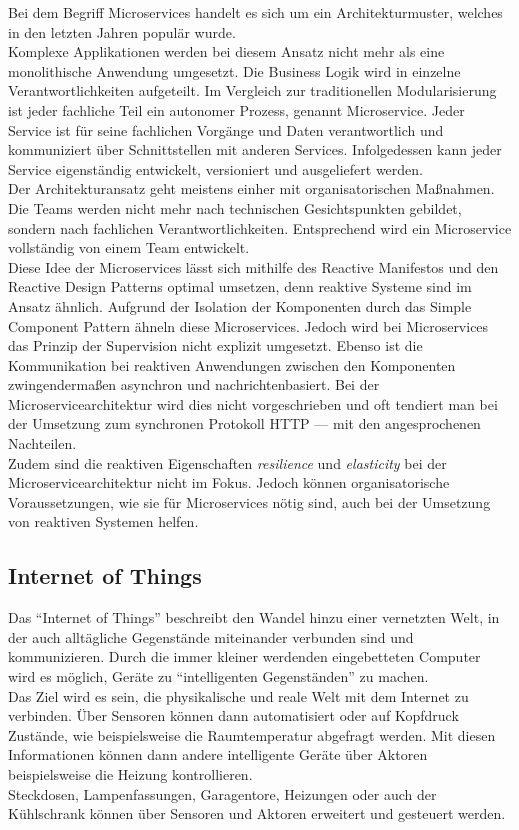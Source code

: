 Bei dem Begriff Microservices handelt es sich um ein Architekturmuster, welches in den letzten Jahren populär wurde.\\
Komplexe Applikationen werden bei diesem Ansatz nicht mehr als eine monolithische Anwendung umgesetzt. Die Business Logik wird in einzelne Verantwortlichkeiten aufgeteilt. Im Vergleich zur traditionellen Modularisierung ist jeder fachliche Teil ein autonomer Prozess, genannt Microservice. Jeder Service ist für seine fachlichen Vorgänge und Daten verantwortlich und kommuniziert über Schnittstellen mit anderen Services. Infolgedessen kann jeder Service eigenständig entwickelt, versioniert und ausgeliefert werden.\\
Der Architekturansatz geht meistens einher mit organisatorischen Maßnahmen. Die Teams werden nicht mehr nach technischen Gesichtspunkten gebildet, sondern nach fachlichen Verantwortlichkeiten. Entsprechend wird ein Microservice vollständig von einem Team entwickelt.\\

Diese Idee der Microservices lässt sich mithilfe des Reactive Manifestos und den Reactive Design Patterns optimal umsetzen, denn reaktive Systeme sind im Ansatz ähnlich. Aufgrund der Isolation der Komponenten durch das Simple Component Pattern ähneln diese Microservices. Jedoch wird bei Microservices das Prinzip der Supervision nicht explizit umgesetzt. Ebenso ist die Kommunikation bei reaktiven Anwendungen zwischen den Komponenten zwingendermaßen asynchron und nachrichtenbasiert. Bei der Microservicearchitektur wird dies nicht vorgeschrieben und oft tendiert man bei der Umsetzung zum synchronen Protokoll HTTP --- mit den angesprochenen Nachteilen.\\
Zudem sind die reaktiven Eigenschaften \textit{resilience} und \textit{elasticity} bei der Microservicearchitektur nicht im Fokus. Jedoch können organisatorische Voraussetzungen, wie sie für Microservices nötig sind, auch bei der Umsetzung von reaktiven Systemen helfen.

\subsection{Internet of Things}
Das \enquote{Internet of Things} beschreibt den Wandel hinzu einer vernetzten Welt, in der auch alltägliche Gegenstände miteinander verbunden sind und kommunizieren. Durch die immer kleiner werdenden eingebetteten Computer wird es möglich, Geräte zu \enquote{intelligenten Gegenständen} zu machen.\\
Das Ziel wird es sein, die physikalische und reale Welt mit dem Internet zu verbinden. Über Sensoren können dann automatisiert oder auf Kopfdruck Zustände, wie beispielsweise die Raumtemperatur abgefragt werden. Mit diesen Informationen können dann andere intelligente Geräte über Aktoren beispielsweise die Heizung kontrollieren.\\
Steckdosen, Lampenfassungen, Garagentore, Heizungen oder auch der Kühlschrank können über Sensoren und Aktoren erweitert und gesteuert werden.\\

